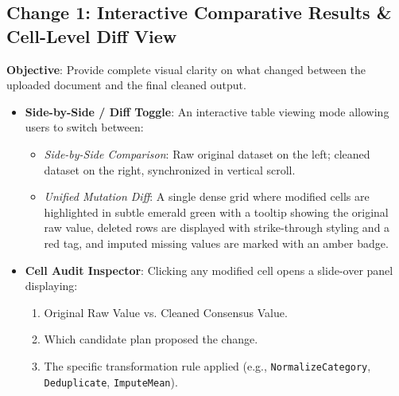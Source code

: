 \documentclass[11pt,a4paper]{article}
\begin{document}
\subsection{Change 1: Interactive Comparative Results \& Cell-Level Diff View}
\textbf{Objective}: Provide complete visual clarity on what changed between the uploaded document and the final cleaned output.
\begin{itemize}[leftmargin=*]
    \item \textbf{Side-by-Side / Diff Toggle}: An interactive table viewing mode allowing users to switch between:
    \begin{itemize}
        \item \textit{Side-by-Side Comparison}: Raw original dataset on the left; cleaned dataset on the right, synchronized in vertical scroll.
        \item \textit{Unified Mutation Diff}: A single dense grid where modified cells are highlighted in subtle emerald green with a tooltip showing the original raw value, deleted rows are displayed with strike-through styling and a red tag, and imputed missing values are marked with an amber badge.
    \end{itemize}
    \item \textbf{Cell Audit Inspector}: Clicking any modified cell opens a slide-over panel displaying:
    \begin{enumerate}
        \item Original Raw Value vs. Cleaned Consensus Value.
        \item Which candidate plan proposed the change.
        \item The specific transformation rule applied (e.g., \texttt{NormalizeCategory}, \texttt{Deduplicate}, \texttt{ImputeMean}).
    \end{enumerate}
\end{itemize}
\end{document}
